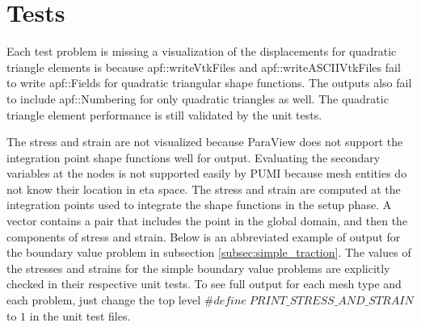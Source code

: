\documentclass{article}
\begin{document}
\section{Tests}
Each test problem is missing a visualization of the displacements for quadratic triangle elements is because apf::writeVtkFiles and apf::writeASCIIVtkFiles fail to write apf::Fields for quadratic triangular shape functions. The outputs also fail to include apf::Numbering for only quadratic triangles as well. The quadratic triangle element performance is still validated by the unit tests.

The stress and strain are not visualized because ParaView does not support the integration point shape functions well for output. Evaluating the secondary variables at the nodes is not supported easily by PUMI because mesh entities do not know their location in eta space. The stress and strain are computed at the integration points used to integrate the shape functions in the setup phase. A vector contains a pair that includes the point in the global domain, and then the components of stress and strain. Below is an abbreviated example of output for the boundary value problem in subsection \ref{subsec:simple_traction}. The values of the stresses and strains for the simple boundary value problems are explicitly checked in their respective unit tests. To see full output for each mesh type and each problem, just change the top level $\#define \; PRINT\_STRESS\_AND\_STRAIN$ to $1$ in the unit test files.
\end{document}
